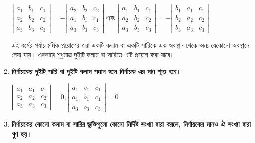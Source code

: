 \begin{enumerate}
	$\left|\begin{array}{ccc}
	a_1 & b_1 & c_1 \\
	a_2 & b_2 & c_2 \\
	a_3 & b_3 & c_3
	\end{array}\right|=-\left|\begin{array}{ccc}
	a_2 & b_2 & c_2 \\
	a_1 & b_1 & c_1 \\
	a_3 & b_3 & c_3
	\end{array}\right|$ এবং $\left|\begin{array}{ccc}
	a_1 & b_1 & c_1 \\
	a_2 & b_2 & c_2 \\
	a_3 & b_3 & c_3
	\end{array}\right|=-\left|\begin{array}{ccc}
	b_1 & a_1 & c_1 \\
	b_2 & a_2 & c_2 \\
	b_3 & a_3 & c_3
	\end{array}\right|$
	\begin{tcolorbox}
		\begin{corollary}
			এই ধর্মের পর্যায়ক্রমিক প্রয়োগের দ্বারা একটি কলাম বা একটি সারিকে এক অবস্থান থেকে অন্য যেকোনো অবস্থানে নেয়া যায়। একবারে শুধুমাত্র দুইটি কলাম বা সারিতে এটি প্রয়োগ করা যাবে।
		\end{corollary}	
	\end{tcolorbox}

	\item \textbf{নির্ণায়কের দুইটি সারি বা দুইটি কলাম সমান হলে নির্ণায়ক এর মান শূন্য হবে।}\label{prop-4}
	
	$\left|\begin{array}{ccc}
		a_1 & a_1 & c_1 \\
		a_2 & a_2 & c_2 \\
		a_3 & a_3 & c_3
	\end{array}\right|=0, \left|\begin{array}{ccc}
	a_1 & b_1 & c_1 \\
	a_1 & b_1 & c_1 \\
	a_3 & b_3 & c_3
	\end{array}\right|=0$
	
	\item \textbf{নির্ণায়কের কোনো কলাম বা সারির ভুক্তিগুলো কোনো নির্দিষ্ট সংখ্যা দ্বারা করলে, নির্ণায়কের মানও ঐ সংখ্যা দ্বারা গুণ হয়।}\label{prop-5}


\end{enumerate}
